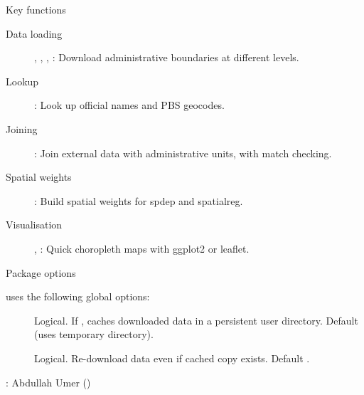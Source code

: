\documentclass[a4paper]{book}
\begin{document}
\begin{Section}{Key functions}

\begin{description}

\item[Data loading] 
, ,
, :
Download administrative boundaries at different levels.

\item[Lookup] 
:
Look up official names and PBS geocodes.

\item[Joining] 
:
Join external data with administrative units, with match checking.

\item[Spatial weights] 
:
Build spatial weights for spdep and spatialreg.

\item[Visualisation] 
, :
Quick choropleth maps with ggplot2 or leaflet.


\end{description}

\end{Section}
%
\begin{Section}{Package options}

 uses the following global options:
\begin{description}

\item[] 
Logical. If , caches downloaded data in a persistent
user directory. Default  (uses temporary directory).

\item[] 
Logical. Re-download data even if cached copy exists.
Default .


\end{description}

\end{Section}
%
\begin{Author}
: Abdullah Umer  ()

\end{Author}
\end{document}
